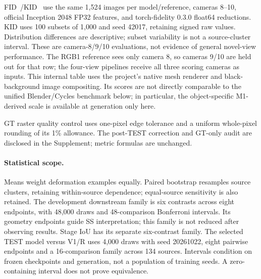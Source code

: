 FID~\cite{heusel2017fid}/KID~\cite{binkowski2018kid} use the same 1,524 images
per model/reference, cameras 8--10, official Inception 2048 FP32 features,
and torch-fidelity 0.3.0 float64 reductions. KID uses 100 subsets of 1,000 and
seed 42017, retaining signed raw values. Distribution differences are
descriptive; subset variability is not a source-cluster interval. These are
camera-8/9/10 evaluations, not evidence of general novel-view performance.
The RGB1 reference sees only camera 8, so cameras 9/10 are held out for that
row; the four-view pipelines receive all three scoring cameras as inputs.
This internal table uses the project's native mesh renderer and
black-background image compositing. Its scores are not directly comparable
to the unified Blender/Cycles benchmark below; in particular, the
object-specific M1-derived scale is available at generation only here.

GT raster quality control uses one-pixel edge tolerance and a uniform
whole-pixel rounding of its 1\% allowance. The post-TEST correction and
GT-only audit are disclosed in the Supplement; metric formulas are unchanged.

\paragraph{Statistical scope.}
Means weight deformation examples equally. Paired bootstrap resamples source
clusters, retaining within-source dependence; equal-source sensitivity is
also retained. The development downstream family is six contrasts across
eight endpoints, with 48,000 draws and 48-comparison Bonferroni intervals.
Its geometry endpoints guide SS interpretation; this family is not reduced
after observing results. Stage IoU has its separate six-contrast family.
The selected TEST model versus V1/R uses 4,000 draws with seed 20261022,
eight pairwise endpoints and a 16-comparison family across 134 sources.
Intervals condition on frozen checkpoints and generation, not a population
of training seeds. A zero-containing interval does not prove equivalence.


